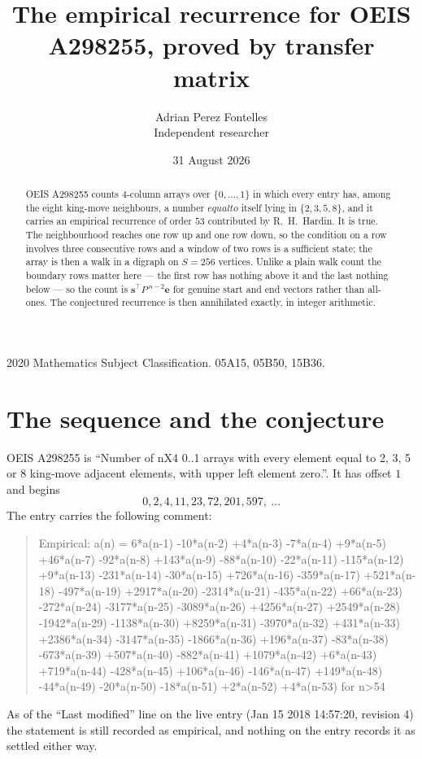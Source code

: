 \documentclass[11pt,a4paper]{article}
\title{The empirical recurrence for OEIS A298255, proved by transfer matrix}
\author{Adrian Perez Fontelles\\ \small Independent researcher}
\date{31 August 2026}
\theoremstyle{plain}
\theoremstyle{definition}
\begin{document}
\maketitle

\begin{abstract}
OEIS A298255 counts $4$-column arrays over $\{0,\dots,1\}$ in which every entry has,
among the eight king-move neighbours, a number $equal to$ itself lying in $\{2,3,5,8\}$, and it carries an empirical
recurrence of order $53$ contributed by R.~H.~Hardin. It is true. The neighbourhood
reaches one row up and one row down, so the condition on a row involves three consecutive
rows and a window of two rows is a sufficient state; the array is then a walk in a digraph
on $S=256$ vertices. Unlike a plain walk count the boundary rows matter here --- the first
row has nothing above it and the last nothing below --- so the count is
$\mathbf{s}^{\!\top}P^{\,n-2}\mathbf{e}$ for genuine start and end vectors rather than
all-ones. The conjectured recurrence is then annihilated exactly, in integer arithmetic.
\end{abstract}

\noindent\small 2020 Mathematics Subject Classification. 05A15, 05B50, 15B36.\normalsize

\section{The sequence and the conjecture}

OEIS A298255 is ``Number of nX4 0..1 arrays with every element equal to 2, 3, 5 or 8 king-move adjacent elements, with upper left element zero.''. It has offset
$1$ and begins
\[
0, 2, 4, 11, 23, 72, 201, 597,\ \dots
\]
The entry carries the following comment:
\begin{quote}\small
Empirical: a(n) = 6*a(n-1) -10*a(n-2) +4*a(n-3) -7*a(n-4) +9*a(n-5) +46*a(n-7) -92*a(n-8) +143*a(n-9) -88*a(n-10) -22*a(n-11) -115*a(n-12) +9*a(n-13) -231*a(n-14) -30*a(n-15) +726*a(n-16) -359*a(n-17) +521*a(n-18) -497*a(n-19) +2917*a(n-20) -2314*a(n-21) -435*a(n-22) +66*a(n-23) -272*a(n-24) -3177*a(n-25) -3089*a(n-26) +4256*a(n-27) +2549*a(n-28) -1942*a(n-29) -1138*a(n-30) +8259*a(n-31) -3970*a(n-32) +431*a(n-33) +2386*a(n-34) -3147*a(n-35) -1866*a(n-36) +196*a(n-37) -83*a(n-38) -673*a(n-39) +507*a(n-40) -882*a(n-41) +1079*a(n-42) +6*a(n-43) +719*a(n-44) -428*a(n-45) +106*a(n-46) -146*a(n-47) +149*a(n-48) -44*a(n-49) -20*a(n-50) -18*a(n-51) +2*a(n-52) +4*a(n-53) for n>54
\end{quote}
As of the ``Last modified'' line on the live entry (Jan 15 2018 14:57:20, revision
4) the statement is still recorded as empirical, and nothing on the entry
records it as settled either way.
\end{document}
